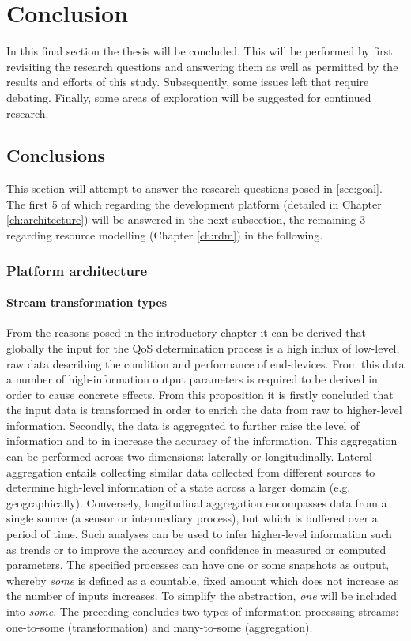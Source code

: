 \chapter{Conclusion}
In this final section the thesis will be concluded. This will be performed by first revisiting the research questions and answering them as well as permitted by the results and efforts of this study. Subsequently, some issues left that require debating. Finally, some areas of exploration will be suggested for continued research.

\section{Conclusions}
\label{sec:conclusions}
This section will attempt to answer the research questions posed in \ref{sec:goal}. The first 5 of which regarding the development platform (detailed in Chapter \ref{ch:architecture}) will be answered in the next subsection, the remaining 3 regarding resource modelling (Chapter \ref{ch:rdm}) in the following.
\subsection{Platform architecture}
\subsubsection{Stream transformation types}
From the reasons posed in the introductory chapter it can be derived that globally the input for the QoS determination process is a high influx of low-level, raw data describing the condition and performance of end-devices. From this data a number of high-information output parameters is required to be derived in order to cause concrete effects. From this proposition it is firstly concluded that the input data is transformed in order to enrich the data from raw to higher-level information. Secondly, the data is aggregated to further raise the level of information and to in increase the accuracy of the information. This aggregation can be performed across two dimensions: laterally or longitudinally. Lateral aggregation entails collecting similar data collected from different sources to determine high-level information of a state across a larger domain (e.g. geographically). Conversely, longitudinal aggregation encompasses data from a single source (a sensor or intermediary process), but which is buffered over a period of time. Such analyses can be used to infer higher-level information such as trends or to improve the accuracy and confidence in measured or computed parameters. The specified processes can have one or some snapshots as output, whereby \emph{some} is defined as a countable, fixed amount which does not increase as the number of inputs increases. To simplify the abstraction, \emph{one} will be included into \emph{some}. The preceding concludes two types of information processing streams: one-to-some (transformation) and many-to-some (aggregation).

